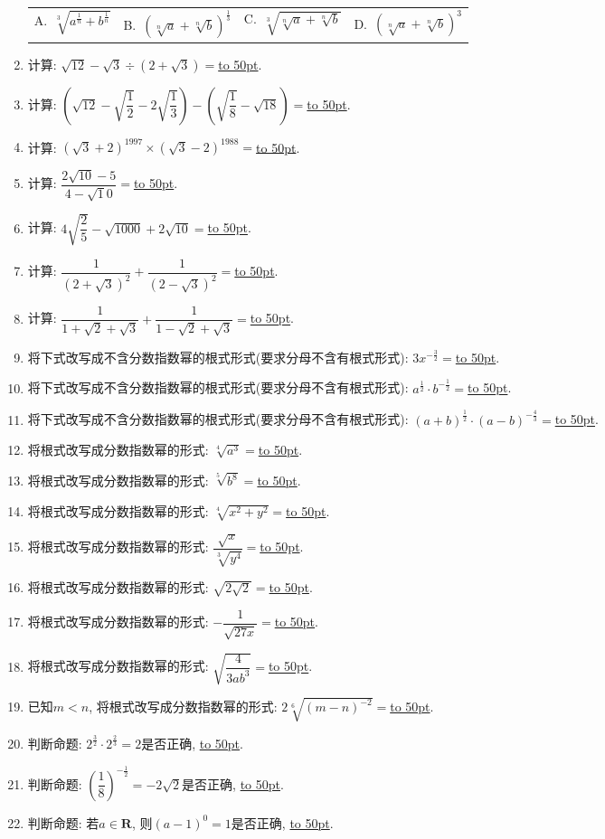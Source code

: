 \documentclass[10pt,a4paper]{article}
\newcommand{\blank}[1]{\underline{\hbox to #1pt{}}}
\newcommand{\fourch}[4]{\par\begin{tabular}{p{.23\textwidth}p{.23\textwidth}p{.23\textwidth}p{.23\textwidth}}
A.~#1 &B.~#2& C.~#3& D.~#4
\end{tabular}}
\begin{document}
\begin{enumerate}[1.]
\fourch{$\sqrt [3]{a^{\frac 1n}+b^{\frac 1n}}$}{$(\sqrt[n]a+\sqrt[n]b)^{\frac 13}$}{$\sqrt [3]{\sqrt[n]a+\sqrt[n]b}$}{$(\sqrt[n]a+\sqrt[n]b)^3$}
\item 计算: $\sqrt {12}-\sqrt 3\div (2+\sqrt 3)=$\blank{50}.
\item 计算: $(\sqrt {12}-\sqrt {\dfrac 12}-2\sqrt {\dfrac 13})-(\sqrt {\dfrac 18}-\sqrt {18})=$\blank{50}.
\item 计算: $(\sqrt 3+2)^{1997}	\times (\sqrt 3-2)^{1988}=$\blank{50}.
\item 计算: $\dfrac{2\sqrt {10}-5}{4-\sqrt 10}=$\blank{50}.
\item 计算: $4\sqrt {\dfrac 25}-\sqrt {1000}+2\sqrt {10}=$\blank{50}.
\item 计算: $\dfrac 1{(2+\sqrt 3)^2}+\dfrac 1{(2-\sqrt 3)^2}=$\blank{50}.
\item 计算: $\dfrac 1{1+\sqrt 2+\sqrt 3}+\dfrac 1{1-\sqrt 2+\sqrt 3}=$\blank{50}.
\item 将下式改写成不含分数指数幂的根式形式(要求分母不含有根式形式): $3x^{-\frac 32}=$\blank{50}.
\item 将下式改写成不含分数指数幂的根式形式(要求分母不含有根式形式): $a^{\frac 12}\cdot b^{-\frac 12}=$\blank{50}.
\item 将下式改写成不含分数指数幂的根式形式(要求分母不含有根式形式): $(a+b)^{\frac 12}\cdot (a-b)^{-\frac 43}=$\blank{50}.
\item 将根式改写成分数指数幂的形式: $\sqrt [4]{a^3}=$\blank{50}.
\item 将根式改写成分数指数幂的形式: $\sqrt [5]{b^8}=$\blank{50}.
\item 将根式改写成分数指数幂的形式: $\sqrt [4]{x^2+y^2}=$\blank{50}.
\item 将根式改写成分数指数幂的形式: $\dfrac{\sqrt x}{\sqrt [3]{y^4}}=$\blank{50}.
\item 将根式改写成分数指数幂的形式: $\sqrt {2\sqrt 2}=$\blank{50}.
\item 将根式改写成分数指数幂的形式: $-\dfrac 1{\sqrt {27x}}=$\blank{50}.
\item 将根式改写成分数指数幂的形式: $\sqrt {\dfrac 4{3ab^3}}=$\blank{50}.
\item 已知$m<n$, 将根式改写成分数指数幂的形式: $2\sqrt [6]{(m-n)^{-2}}=$\blank{50}.
\item 判断命题: $2^{\frac 32}\cdot 2^{\frac 23}=2$是否正确, \blank{50}.
\item 判断命题: $(\dfrac 18)^{-\frac 12}=-2\sqrt 2$是否正确, \blank{50}.
\item 判断命题: 若$a\in \mathbf{R}$, 则$(a-1)^0=1$是否正确, \blank{50}.

\end{enumerate}
\end{document}
